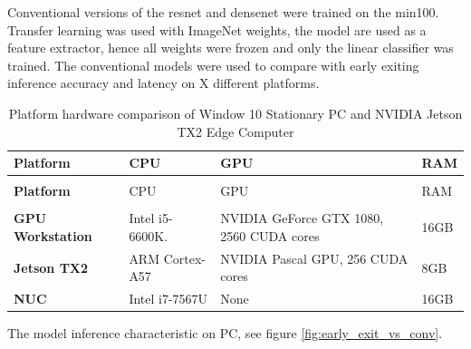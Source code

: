 Conventional versions of the \gls{resnet} and \gls{densenet} were trained on the \gls{min100}. Transfer learning was used with ImageNet weights, the model are used as a feature extractor, hence all weights were frozen and only the linear classifier was trained. The conventional models were used to compare with early exiting inference accuracy and latency on X different platforms.


\begin{longtabu}{>{\bfseries}X[0.8]|X|X[1.5]|X[r0.3]}
	\caption[Platform hardware comparison]{Platform hardware comparison of Window 10 Stationary PC and NVIDIA Jetson TX2 Edge Computer} \label{tbl:platforms} \\
	\toprule
	\rowfont{\bfseries}
	Platform & CPU & GPU & RAM  \tabularnewline
	\bottomrule
	\endfirsthead
	\\
	\toprule
	\rowfont{\bfseries}
	Platform & CPU & GPU & RAM  \tabularnewline
	\bottomrule
	\endhead %
	\bottomrule
	\\
	\endfoot
	\hline
	\endlastfoot
	GPU Workstation	& Intel i5-6600K.	& NVIDIA GeForce GTX 1080, 2560 CUDA cores	& 16GB \tabularnewline
	\hline
	Jetson TX2	& ARM Cortex-A57 	& NVIDIA Pascal GPU, 256 CUDA cores 		& 8GB \tabularnewline
	\hline
	NUC		  	& Intel i7-7567U	& None										& 16GB \tabularnewline									
	\bottomrule
\end{longtabu}

The model inference characteristic on PC, see figure \ref{fig:early_exit_vs_conv}.

